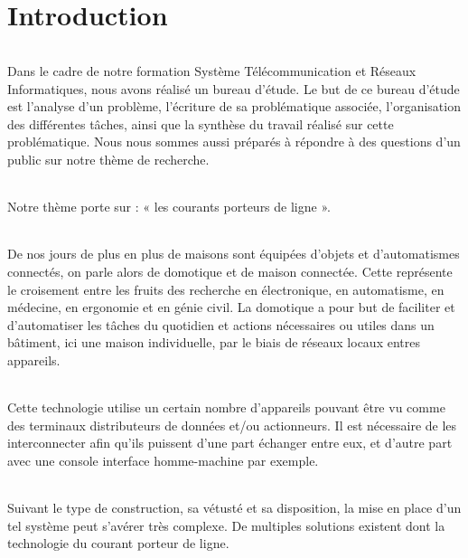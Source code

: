 
\part*{Introduction}
    \paragraph{}
Dans le cadre de notre formation Système Télécommunication et Réseaux Informatiques, nous avons réalisé un bureau d'étude.
Le but de ce bureau d'étude est l'analyse d'un problème, l'écriture de sa problématique associée,
l'organisation des différentes tâches, ainsi que la synthèse du travail réalisé sur cette problématique.
Nous nous sommes aussi préparés à répondre à des questions d'un public sur notre thème de recherche.
    \paragraph{}
Notre thème porte sur : « les courants porteurs de ligne ».
    \paragraph{}
De nos jours de plus en plus de maisons sont équipées d'objets et d'automatismes connectés, on parle alors de domotique et de maison connectée.
Cette représente le croisement entre les fruits des recherche en électronique, en automatisme, en médecine, en ergonomie et en génie civil.
La domotique a pour but de faciliter et d'automatiser les tâches du quotidien et actions nécessaires ou utiles dans un bâtiment,
ici une maison individuelle, par le biais de réseaux locaux entres appareils.
    \paragraph{}
Cette technologie utilise un certain nombre d'appareils pouvant être vu comme des terminaux distributeurs de données et/ou actionneurs.
Il est nécessaire de les interconnecter afin qu'ils puissent d'une part échanger entre eux,
et d'autre part avec une console interface homme-machine par exemple.
    \paragraph{}
Suivant le type de construction, sa vétusté et sa disposition, la mise en place d'un tel système peut s'avérer très complexe.
De multiples solutions existent dont la technologie du courant porteur de ligne.

    \clearpage


